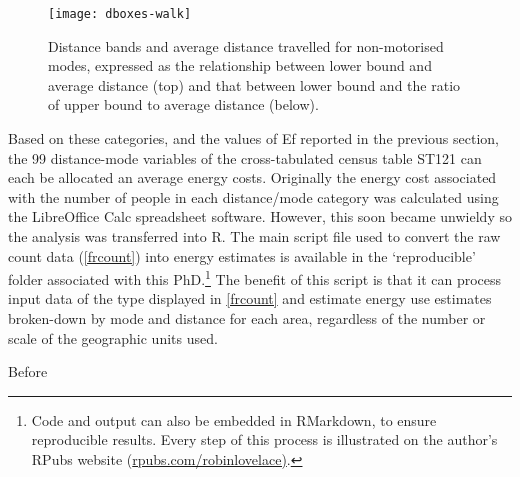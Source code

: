 \begin{figure}[htbp]
\begin{center}
    \texttt{[image: dboxes-walk]}  \end{center}
  \caption[Distance bands and average distance travelled for active modes]
  {Distance bands and average distance travelled for non-motorised modes, expressed
  as the relationship between lower bound and average distance (top)
  and that between lower bound and the ratio of upper bound to average distance
  (below).} %
 \label{fdboxes2}
\end{figure}

% 

Based on these categories, and the values of Ef reported in the previous section,
the 99 distance-mode variables of the cross-tabulated
census table ST121 can each be allocated an average energy
costs.
Originally the energy cost associated with the number of people in
each distance/mode category was calculated using the LibreOffice Calc
spreadsheet software. However, this soon became unwieldy so the analysis
was transferred into R. The main script file used to convert the raw
count data (\cref{frcount}) into energy estimates is available in the
`reproducible' folder associated with this
PhD.\footnote{Code
and output can also be embedded in RMarkdown, to ensure reproducible results.
Every step of this process is illustrated on the author's RPubs website
(\href{http://rpubs.com/RobinLovelace/7178}{rpubs.com/robinlovelace)}.}
The benefit of this script is that it can process input data of the type
displayed in \cref{frcount} and estimate energy use estimates broken-down by
mode and distance for each area, regardless of the number or scale of the
geographic units used.

Before 

